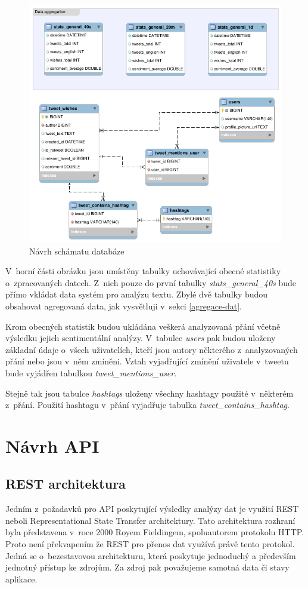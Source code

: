 \documentclass[thesis=B,czech]{FITthesis}[2012/06/26]
\begin{document}
\begin{figure}[ht]
   	\centering
   	\includegraphics[width=1\textwidth]{../db_model.png}
   	\caption{Návrh schámatu databáze}
   	\label{fig:db-structure}
\end{figure}

V~horní části obrázku jsou umístěny tabulky uchovávající obecné statistiky o~zpracovaných datech. Z~nich pouze do první tabulky \textit{stats\_general\_40s} bude přímo vkládat data systém pro analýzu textu. Zbylé dvě tabulky budou obsahovat agregovaná data, jak vysvětluji v~sekci \ref{agregace-dat}. 

Krom obecných statistik budou ukládána veškerá analyzovaná přání včetně výsledku jejich sentimentální analýzy. V~tabulce \textit{users} pak budou uloženy základní údaje o~všech uživatelích, kteří jsou autory některého z~analyzovaných přání nebo jsou v~něm zmíněni. Vztah vyjadřující zmínění uživatele v~tweetu bude vyjádřen tabulkou \textit{tweet\_mentions\_user}. 

Stejně tak jsou tabulce \textit{hashtags} uloženy všechny hashtagy použité v~některém z~přání. Použití hashtagu v~přání vyjadřuje tabulka \textit{tweet\_contains\_hashtag}.

\section{Návrh API}
\label{rest}
\subsection{REST architektura}
	Jedním z~požadavků pro API poskytující výsledky analýzy dat je využití REST neboli Representational State Transfer architektury. Tato architektura rozhraní byla představena v~roce 2000 Royem Fieldingem, spoluautorem protokolu HTTP\cite{rest-diser}. Proto není překvapením že REST pro přenos dat využívá právě tento protokol. Jedná se o~bezestavovou architekturu, která poskytuje jednoduchý a především jednotný přístup ke zdrojům. Za zdroj pak považujeme samotná data či stavy aplikace. 
	
\end{document}
